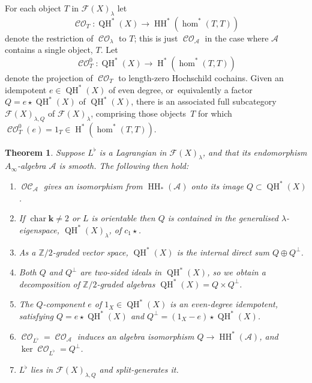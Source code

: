 \documentclass[10pt]{amsart}
\newtheorem{theorem}{Theorem}[section]
\theoremstyle{definition}
\newcommand{\ZZ}{\mathbb{Z}}
\newcommand{\LL}{L^\flat}
\newcommand{\calA}{\mathcal{A}}
\newcommand{\Fuk}{\mathcal{F}}
\newcommand{\kk}{{\boldsymbol{k}}}
\newcommand{\Char}{\operatorname{char}}
\newcommand{\rH}{\operatorname{H}}
\newcommand{\HH}{\operatorname{HH}}
\newcommand{\CO}{\operatorname{\mathcal{CO}}}
\newcommand{\OC}{\operatorname{\mathcal{OC}}}
\newcommand{\QH}{\operatorname{QH}}
\newcommand{\qprod}{\mathbin{\star}}
\begin{document}
For each object $T$ in $\Fuk(X)_\lambda$ let
\[
\CO_T : \QH^*(X) \to \HH^*(\hom^*(T, T))
\]
denote the restriction of $\CO_\lambda$ to $T$; this is just $\CO_\calA$ in the case where $\calA$ contains a single object, $T$. Let
\[
\CO^0_T : \QH^*(X) \to \rH^*(\hom^*(T, T))
\]
denote the projection of $\CO_T$ to length-zero Hochschild cochains. Given an idempotent $e \in \QH^*(X)$ of even degree, or~equivalently a factor $Q = e \qprod \QH^*(X)$ of $\QH^*(X)$, there is an associated full subcategory $\Fuk(X)_{\lambda,Q}$ of $\Fuk(X)_\lambda$, comprising those objects~$T$ for which $\CO^0_T(e) = 1_T \in \rH^*(\hom^*(T, T))$.

\begin{theorem}
\label{thmGen}
Suppose $\LL$ is a Lagrangian in $\Fuk(X)_\lambda$, and that its endomorphism $A_\infty$-algebra $\calA$ is smooth. The following then hold:
\begin{enumerate}
\item\label{genOC} $\OC_\calA$ gives an isomorphism from $\HH_*(\calA)$ onto its image $Q \subset \QH^*(X)$.
\item\label{genEspace} If $\Char \kk \neq 2$ or $L$ is orientable then $Q$ is contained in the generalised $\lambda$\nobreakdash-eigen\-space, $\QH^*(X)_\lambda$, of $c_1\qprod$.
\item\label{genVSdecomp} As a $\ZZ/2$-graded vector space, $\QH^*(X)$ is the internal direct sum $Q \oplus Q^\perp$.
\item\label{genAlgDecomp} Both $Q$ and $Q^\perp$ are two-sided ideals in $\QH^*(X)$, so we obtain a decomposition of $\ZZ/2$-graded algebras $\QH^*(X) = Q \times Q^\perp$.
\item\label{genIdemp} The $Q$-component $e$ of $1_X \in \QH^*(X)$ is an even-degree idempotent, satisfying $Q = e \qprod \QH^*(X)$ and $Q^\perp = (1_X-e) \qprod \QH^*(X)$.
\item\label{genCO} $\CO_{\LL} \!=\! \CO_\calA$ induces an algebra isomorphism $Q \!\to\! \HH^*(\calA)$, and \hbox{$\ker \CO_{\LL} \!=\! Q^\perp$}.
\item\label{genSplitGen} $\LL$ lies in $\Fuk(X)_{\lambda, Q}$ and split-generates it.
\end{enumerate}
\end{theorem}
\end{document}
